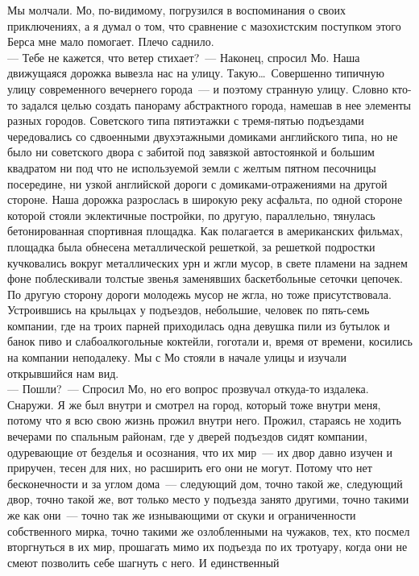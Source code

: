 Мы молчали. Мо, по-видимому, погрузился в воспоминания о своих приключениях, а 
я думал о том, что сравнение с мазохистским поступком этого Берса мне мало 
помогает. Плечо саднило.\\
--- Тебе не кажется, что ветер стихает?~--- Наконец, спросил Мо. Наша движущаяся 
дорожка вывезла нас на улицу. Такую\ldots\ Совершенно типичную улицу 
современного вечернего города~--- и поэтому странную улицу. Словно кто-то задался целью 
создать панораму абстрактного города, намешав в нее элементы разных городов. Советского 
типа пятиэтажки с тремя-пятью подъездами чередовались со сдвоенными 
двухэтажными домиками английского типа, но не было ни советского двора с забитой под 
завязкой автостоянкой и большим квадратом ни под что не используемой земли с желтым 
пятном песочницы посередине, ни узкой английской дороги с домиками-отражениями 
на другой стороне. Наша дорожка разрослась в широкую реку асфальта, по одной 
стороне которой стояли эклектичные постройки, по другую, параллельно, тянулась 
бетонированная спортивная площадка. Как полагается в американских фильмах, 
площадка была обнесена металлической решеткой, за решеткой подростки 
кучковались вокруг металлических урн и жгли мусор, в свете пламени на заднем фоне 
поблескивали толстые звенья заменявших баскетбольные сеточки цепочек. По другую 
сторону дороги молодежь мусор не жгла, но тоже присутствовала. Устроившись на 
крыльцах у подъездов, небольшие, человек по пять-семь компании, где на троих 
парней приходилась одна девушка пили из бутылок и банок пиво и слабоалкогольные 
коктейли, гоготали и, время от времени, косились на компании неподалеку. Мы с 
Мо стояли в начале улицы и изучали открывшийся нам вид.\\
--- Пошли?~--- Спросил Мо, но его вопрос прозвучал откуда-то издалека. Снаружи. Я 
же был внутри и смотрел на город, который тоже внутри меня, потому что я всю свою 
жизнь прожил внутри него. Прожил, стараясь не ходить вечерами по спальным 
районам, где у дверей подъездов сидят компании, одуревающие от безделья и 
осознания, что их мир~--- их двор давно изучен и приручен, тесен для них, но 
расширить его они не могут. Потому что нет бесконечности и за углом дома~--- 
следующий дом, точно такой же, следующий двор, точно такой же, вот только место 
у подъезда занято другими, точно такими же как они~--- точно так же изнывающими 
от скуки и ограниченности собственного мирка, точно такими же озлобленными на 
чужаков, тех, кто посмел вторгнуться в их мир, прошагать мимо их подъезда по их 
тротуару, когда они не смеют позволить себе шагнуть с него. И единственный 
